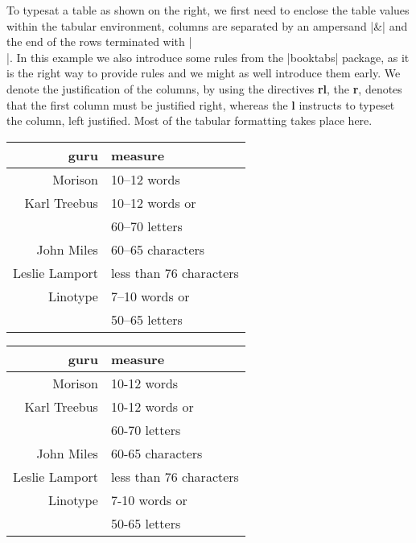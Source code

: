 \begin{multicols}{2}
To typesat a  table as shown on the right, we first need to enclose the table values within the tabular environment, columns are separated by an ampersand |&| and the end of the rows terminated with |\\|.
In this example we also introduce some rules from the |booktabs| package, as it is the right way to provide rules and we might as well introduce them early. We denote the justification of the columns, by using the directives \textbf{rl}, the \textbf{r}, denotes that the first column must be justified right, whereas the \textbf{l} instructs \latex to typeset the column, left justified. Most of the tabular formatting takes place here.
\columnbreak

\begin{tabular}{rl}
\toprule
 guru 			& measure \\
\midrule
Morison         		& 10--12 words \\
Karl Treebus  		& 10--12 words or\\
                      		& 60--70 letters \\
John Miles      		& 60--65 characters \\
Leslie Lamport 		& less than 76 characters \\
Linotype            	& 7--10 words or\\
& 50--65 letters\\
\bottomrule   %
\end{tabular}




\topline
{}
\begin{Code}
\begin{tabular}{rl}
\toprule
  guru                & measure \\
\midrule
  Morison             & 10-12 words \\
  Karl Treebus        & 10-12 words or\\
                      & 60-70 letters \\
  John Miles          & 60-65 characters \\
  Leslie Lamport      & less than 76 characters \\
  Linotype            & 7-10 words or\\
                      & 50-65 letters\\
\bottomrule
\end{tabular}
\end{Code}
\medskip

\bottomline

\end{multicols}



